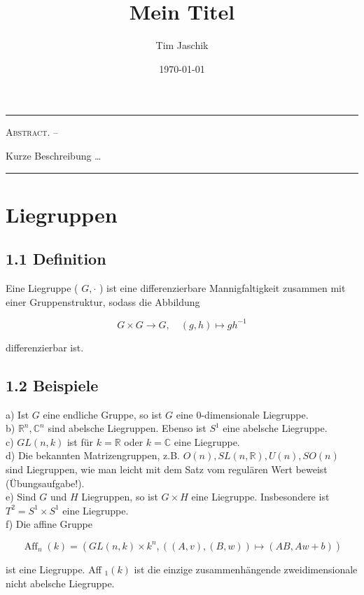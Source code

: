 \documentclass[10pt, letterpaper]{article}
\title{Mein Titel}
\author{Tim Jaschik}
\date{\today}
\renewenvironment{abstract}
  {
    \begin{adjustwidth}{1.5cm}{1.5cm}
    \small
    \textsc{Abstract. –}%
  }
  {
    \end{adjustwidth}
  }
\begin{document}
\maketitle
\rule{\textwidth}{0.5pt}
\begin{abstract}
Kurze Beschreibung …
\end{abstract}
\rule{\textwidth}{0.5pt}
\vspace{0.5cm}

\tableofcontents

\pagebreak




\section{Liegruppen}


\subsection*{1.1 Definition}
Eine Liegruppe ( $G, \cdot$ ) ist eine differenzierbare Mannigfaltigkeit zusammen mit einer Gruppenstruktur, sodass die Abbildung

$$
G \times G \rightarrow G, \quad(g, h) \mapsto g h^{-1}
$$

differenzierbar ist.

\subsection*{1.2 Beispiele}
a) Ist $G$ eine endliche Gruppe, so ist $G$ eine 0-dimensionale Liegruppe.\\
b) $\mathbb{R}^{n}, \mathbb{C}^{n}$ sind abelsche Liegruppen. Ebenso ist $S^{1}$ eine abelsche Liegruppe.\\
c) $G L(n, k)$ ist für $k=\mathbb{R}$ oder $k=\mathbb{C}$ eine Liegruppe.\\
d) Die bekannten Matrizengruppen, z.B. $O(n), S L(n, \mathbb{R}), U(n), S O(n)$ sind Liegruppen, wie man leicht mit dem Satz vom regulären Wert beweist (Übungsaufgabe!).\\
e) Sind $G$ und $H$ Liegruppen, so ist $G \times H$ eine Liegruppe. Insbesondere ist $T^{2}=S^{1} \times S^{1}$ eine Liegruppe.\\
f) Die affine Gruppe

$$
\operatorname{Aff}_{n}(k)=\left(G L(n, k) \times k^{n},((A, v),(B, w)) \mapsto(A B, A w+b)\right)
$$

ist eine Liegruppe. Aff ${ }_{1}(k)$ ist die einzige zusammenhängende zweidimensionale nicht abelsche Liegruppe.
\end{document}
